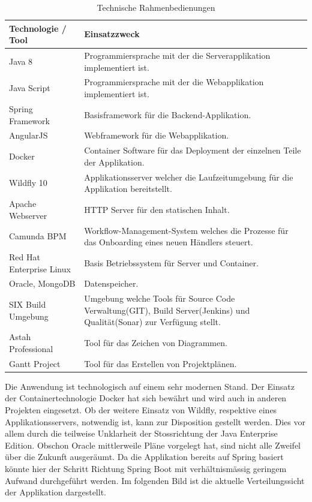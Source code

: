 \begin{table}[H]
	\centering
	\caption{Technische Rahmenbedienungen}
	\begin{tabular}{ | p{4cm} | p{11cm} | }
		\toprule
		{\textbf{Technologie / Tool}} & {\textbf{Einsatzzweck}} \\
		\midrule
		Java 8 & Programmiersprache mit der die Serverapplikation implementiert ist. \\ \hline
		Java Script & Programmiersprache mit der die Webapplikation implementiert ist. \\ \hline
		Spring Framework & Basisframework für die Backend-Applikation.  \\ \hline
		AngularJS & Webframework für die Webapplikation. \\ \hline
		Docker & Container Software für das Deployment der einzelnen Teile der Applikation. \\ \hline
		Wildfly 10 & Applikationsserver welcher die Laufzeitumgebung für die Applikation bereitstellt. \\ \hline
		Apache Webserver & HTTP Server für den statischen Inhalt. \\ \hline
		Camunda BPM & Workflow-Management-System welches die Prozesse für das Onboarding eines neuen Händlers steuert. \\ \hline
		Red Hat Enterprise Linux & Basis Betriebssystem für Server und Container.\\ \hline
		Oracle, MongoDB & Datenspeicher. \\ \hline
		SIX Build Umgebung & Umgebung welche Tools für Source Code Verwaltung(GIT), Build Server(Jenkins) und Qualität(Sonar) zur Verfügung stellt.\\ \hline
		Astah Professional & Tool für das Zeichen von Diagrammen.\\ \hline
		Gantt Project & Tool für das Erstellen von Projektplänen.\\		
		\bottomrule
	\end{tabular}
\end{table}
Die Anwendung ist technologisch auf einem sehr modernen Stand. Der Einsatz der Containertechnologie Docker hat sich bewährt und wird auch in anderen Projekten eingesetzt. Ob der weitere Einsatz von Wildfly, respektive eines Applikationsservers, notwendig ist, kann zur Disposition gestellt werden. Dies vor allem durch die teilweise Unklarheit der Stossrichtung der Java Enterprise Edition. Obschon Oracle mittlerweile Pläne vorgelegt hat, sind nicht alle Zweifel über die Zukunft ausgeräumt. Da die Applikation bereits auf Spring basiert könnte hier der Schritt Richtung Spring Boot mit verhältnismässig geringem Aufwand durchgeführt werden. Im folgenden Bild ist die aktuelle Verteilungssicht der Applikation dargestellt.
